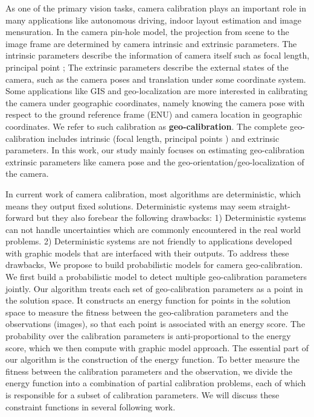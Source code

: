 As one of the primary vision tasks, camera calibration plays an
important role in many applications like autonomous driving, indoor
layout estimation and image mensuration. 
In the camera pin-hole model, the projection from scene to the image
frame are determined by camera intrinsic and extrinsic parameters. 
The intrinsic parameters describe the information of camera
itself such as focal length, principal point \etc; 
The extrinsic parameters describe the external states of the
camera, such as the camera poses and translation under some
coordinate system.
Some applications like GIS and geo-localization are more interested in
calibrating the camera under geographic coordinates, namely knowing
the camera pose with respect to the ground reference frame (\ie ENU)
and camera location in geographic coordinates. We refer to such
calibration as \textbf{geo-calibration}.
The complete geo-calibration includes intrinsic (focal
length, principal points \etc) and extrinsic parameters.
In this work, our study mainly focuses on estimating geo-calibration
extrinsic parameters like camera pose and the
geo-orientation/geo-localization of the camera.

In current work of camera calibration, most algorithms are
deterministic, which means they output fixed solutions. Deterministic
systems may seem straight-forward but they also forebear the following
drawbacks: 1) Deterministic systems can not handle uncertainties which
are commonly encountered in the real world problems.  2) Deterministic
systems are not friendly to applications developed with graphic models
that are interfaced with their outputs.
To address these drawbacks, We propose to build probabilistic
models for camera geo-calibration.
We first build a probabilistic model to detect multiple
geo-calibration parameters jointly.  Our algorithm treats each set of
geo-calibration parameters as a point in the solution space. It
constructs an energy function for points in the solution space to
measure the fitness between the geo-calibration parameters and the
observations (images), so that each point is associated with an energy
score.  The probability over the calibration parameters is
anti-proportional to the energy score, which we then compute with
graphic model approach. The essential part of our algorithm is the
construction of the energy function. To better measure the fitness
between the calibration parameters and the observation, we divide the
energy function into a combination of partial calibration problems,
each of which is responsible for a subset of calibration parameters.
We will discuss these constraint functions in several following work.
 
